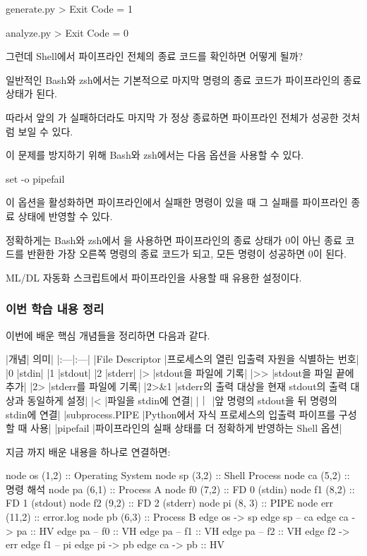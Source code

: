 \begin{dhkdir}
generate.py
> Exit Code = 1
\end{dhkdir}

\begin{dhkdir}
analyze.py
> Exit Code = 0
\end{dhkdir}

그런데 Shell에서 파이프라인 전체의 종료 코드를 확인하면 어떻게 될까?

일반적인 Bash와 zsh에서는 기본적으로 마지막 명령의 종료 코드가 파이프라인의 종료 상태가 된다.

따라서 앞의 가 실패하더라도 마지막 가 정상 종료하면 파이프라인 전체가 성공한 것처럼 보일 수 있다.

이 문제를 방지하기 위해 Bash와 zsh에서는 다음 옵션을 사용할 수 있다.

\begin{dhkzsh}
set -o pipefail
\end{dhkzsh}

이 옵션을 활성화하면 파이프라인에서 실패한 명령이 있을 때 그 실패를 파이프라인 종료 상태에 반영할 수 있다.

정확하게는 Bash와 zsh에서 을 사용하면 파이프라인의 종료 상태가 0이 아닌 종료 코드를 반환한 가장 오른쪽 명령의 종료 코드가 되고, 모든 명령이 성공하면 0이 된다.

ML/DL 자동화 스크립트에서 파이프라인을 사용할 때 유용한 설정이다.

\subsubsection{이번 학습 내용 정리}

이번에 배운 핵심 개념들을 정리하면 다음과 같다.

\begin{dhktable}
|개념|	의미|
|:---|:---|
|File Descriptor	|프로세스의 열린 입출력 자원을 식별하는 번호|
|0	|stdin|
|1	|stdout|
|2	|stderr|
|>	|stdout을 파일에 기록|
|>>	|stdout을 파일 끝에 추가|
|2>	|stderr를 파일에 기록|
|2>&1	|stderr의 출력 대상을 현재 stdout의 출력 대상과 동일하게 설정|
|<	|파일을 stdin에 연결|
|｜	|앞 명령의 stdout을 뒤 명령의 stdin에 연결|
|subprocess.PIPE	|Python에서 자식 프로세스의 입출력 파이프를 구성할 때 사용|
|pipefail	|파이프라인의 실패 상태를 더 정확하게 반영하는 Shell 옵션|
\end{dhktable}

지금 까지 배운 내용을 하나로 연결하면:

\begin{dhkdiagram}[in=4]
node os (1,2) :: Operating System
node sp (3,2) :: Shell Process
node ca (5,2) :: 명령 해석
node pa (6,1) :: Process A
node f0 (7,2) :: FD 0 (stdin)
node f1 (8,2) :: FD 1 (stdout)
node f2 (9,2) :: FD 2 (stderr)
node pi (8, 3) :: PIPE
node err (11,2) :: error.log
node pb (6,3) :: Process B
edge os -> sp
edge sp -- ca
edge ca -> pa :: HV
edge pa -- f0 :: VH
edge pa -- f1 :: VH
edge pa -- f2 :: VH
edge f2 -> err
edge f1 -- pi
edge pi -> pb
edge ca -> pb :: HV
\end{dhkdiagram}

